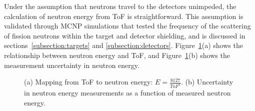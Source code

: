 \documentclass[%
 reprint,
 amsmath,amssymb,
 aps,
 nofootinbib
]{revtex4-1}
\begin{document}
Under the assumption that neutrons travel to the detectors unimpeded, the calculation of neutron energy from ToF is straightforward.
This assumption is validated through MCNP simulations that tested the frequency of the scattering of fission neutrons within the target and detector shielding, and is discussed in sections~\ref{subsection:targets} and \ref{subsection:detectors}.
Figure~\ref{fig:ErgUncertainty}(a) shows the relationship between neutron energy and ToF, and Figure~\ref{fig:ErgUncertainty}(b) shows the measurement uncertainty in neutron energy.
\begin{figure}[]
    
    \caption{(a) Mapping from ToF to neutron energy: $E = \frac{8127}{ToF^{2}}$.
    (b) Uncertainty in neutron energy measurements as a function of measured neutron energy.}
    \label{fig:ErgUncertainty}
\end{figure}
\end{document}
